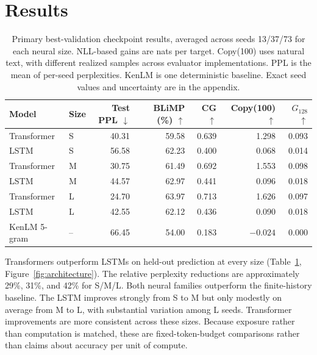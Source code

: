 \documentclass[10pt]{article}
\begin{document}
\section{Results}

\begin{table}[t]
\centering
\small
\begin{tabular}{llrrrrr}
\toprule
Model & Size & Test PPL $\downarrow$ & BLiMP (\%) $\uparrow$ & CG $\uparrow$ & Copy(100) $\uparrow$ & $G_{128}$ $\uparrow$ \\
\midrule
Transformer & S & 40.31 & 59.58 & 0.639 & 1.298 & 0.093 \\
LSTM & S & 56.58 & 62.23 & 0.400 & 0.068 & 0.014 \\
Transformer & M & 30.75 & 61.49 & 0.692 & 1.553 & 0.098 \\
LSTM & M & 44.57 & 62.97 & 0.441 & 0.096 & 0.018 \\
Transformer & L & 24.70 & 63.97 & 0.713 & 1.626 & 0.097 \\
LSTM & L & 42.55 & 62.12 & 0.436 & 0.090 & 0.018 \\
\midrule
KenLM 5-gram & -- & 66.45 & 54.00 & 0.183 & $-0.024$ & 0.000 \\
\bottomrule
\end{tabular}
\caption{Primary best-validation checkpoint results, averaged across seeds 13/37/73 for each neural size. NLL-based gains are nats per target. Copy(100) uses natural text, with different realized samples across evaluator implementations. PPL is the mean of per-seed perplexities. KenLM is one deterministic baseline. Exact seed values and uncertainty are in the appendix.}
\label{tab:main}
\end{table}

Transformers outperform LSTMs on held-out prediction at every size (Table~\ref{tab:main}, Figure~\ref{fig:architecture}). The relative perplexity reductions are approximately 29\%, 31\%, and 42\% for S/M/L. Both neural families outperform the finite-history baseline. The LSTM improves strongly from S to M but only modestly on average from M to L, with substantial variation among L seeds. Transformer improvements are more consistent across these sizes. Because exposure rather than computation is matched, these are fixed-token-budget comparisons rather than claims about accuracy per unit of compute.
\end{document}
